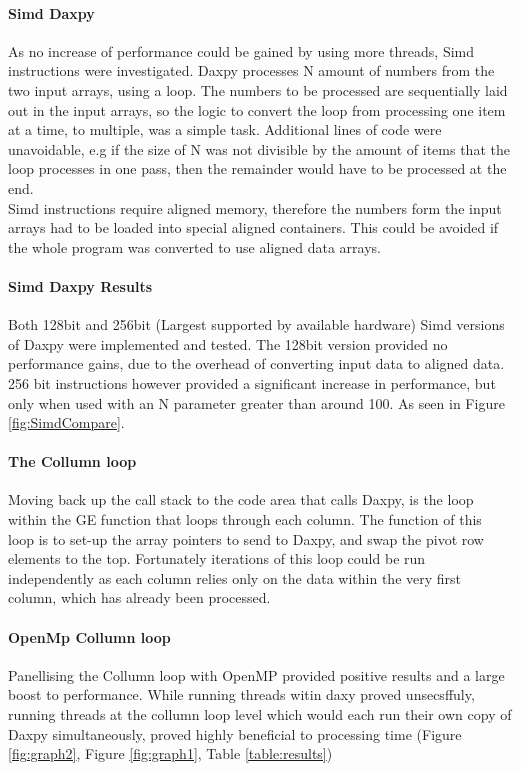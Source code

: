 \documentclass[conference]{acmsiggraph}
\begin{document}
\paragraph{Simd Daxpy}
As no increase of performance could be gained by using more threads, Simd instructions were investigated.
Daxpy processes N amount of numbers from the two input arrays, using a loop. 
The numbers to be processed are sequentially laid out in the input arrays, so the logic to convert the loop from processing one item at a time, to multiple, was a simple task.
Additional lines of code were unavoidable, e.g if the size of N was not divisible by the amount of items that the loop processes in one pass, then the remainder would have to be processed at the end.
\\
Simd instructions require aligned memory, therefore the numbers form the input arrays had to be loaded into special aligned containers. 
This could be avoided if the whole program was converted to use aligned data arrays.

\paragraph{Simd Daxpy Results}
Both 128bit and 256bit (Largest supported by available hardware) Simd versions of Daxpy were implemented and tested.
The 128bit version provided no performance gains, due to the overhead of converting input data to aligned data.
256 bit instructions however provided a significant increase in performance, but only when used with an N parameter greater than around 100. As seen in Figure \ref{fig:SimdCompare}.


\paragraph{The Collumn loop}
Moving back up the call stack to the code area that calls Daxpy, is the loop within the GE function that loops through each column.
The function of this loop is to set-up the array pointers to send to Daxpy, and swap the pivot row elements to the top.
Fortunately iterations of this loop could be run independently as each column relies only on the data within the very first column, which has already been processed.

\paragraph{OpenMp Collumn loop}
Panellising the Collumn loop with OpenMP provided positive results and a large boost to performance. While running threads witin daxy proved unsecsffuly, running threads at the collumn loop level which would each run their own copy of Daxpy simultaneously, proved highly beneficial to processing time (Figure \ref{fig:graph2}, Figure \ref{fig:graph1}, Table \ref{table:results}) 
\end{document}

